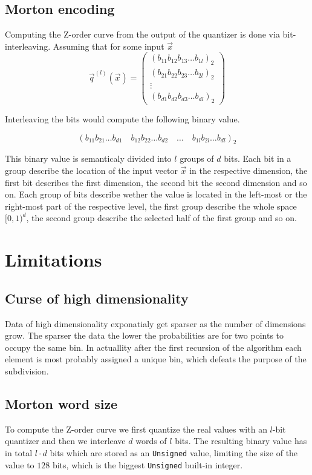 \documentclass{juliacon}
\begin{document}
\subsection{Morton encoding}
Computing the Z-order curve from the output of the quantizer is done via bit-interleaving.
Assuming that for some input $\vec{x}$
$$
\vec{q}^{(l)}(\vec{x}) =
\begin{pmatrix}
  (b_{11}b_{12}b_{13}\dots b_{1l})_2\\
  (b_{21}b_{22}b_{23}\dots b_{2l})_2\\
  \vdots \\
  (b_{d1}b_{d2}b_{d3}\dots b_{dl})_2
\end{pmatrix}
$$

Interleaving the bits would compute the following binary value.

$$(b_{11}b_{21}\dots b_{d1}\quad b_{12}b_{22}\dots b_{d2}\quad \dots \quad b_{1l}b_{2l}\dots b_{dl})_2$$

This binary value is semanticaly divided into $l$ groups of $d$ bits. Each bit in a group
describe the location of the input vector $\vec{x}$ in the respective dimension, the
first bit describes the first dimension, the second bit the second dimension and so on.
Each group of bits describe wether the value is located in the left-most or the
right-most part of the respective level, the first group describe the whole space
$[0,1)^d$, the second group describe the selected half of the first group and so on.

\section{Limitations}

\subsection{Curse of high dimensionality}
Data of high dimensionality exponatialy get sparser as the number of dimensions grow.
The sparser the data the lower the probabilities are for two points to occupy the same
bin. In actuallity after the first recursion of the algorithm each element is most
probably assigned a unique bin, which defeats the purpose of the subdivision.

\subsection{Morton word size}
To compute the Z-order curve we first quantize the real values with an $l$-bit
quantizer and then we interleave $d$ words of $l$ bits. The resulting binary value has in
total $l\cdot d$ bits which are stored as an \verb|Unsigned| value, limiting the size of the
value to $128$ bits, which is the biggest \verb|Unsigned| built-in integer.
\end{document}
